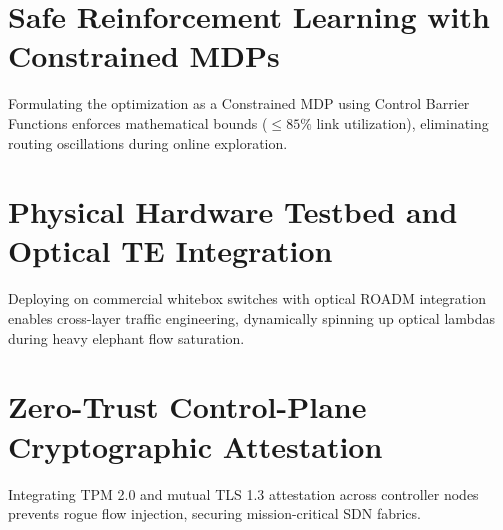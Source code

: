 \documentclass[12pt,a4paper,oneside]{report}
\begin{document}
\section{Safe Reinforcement Learning with Constrained MDPs}
Formulating the optimization as a Constrained MDP using Control Barrier Functions enforces mathematical bounds ($\le 85\%$ link utilization), eliminating routing oscillations during online exploration.

\section{Physical Hardware Testbed and Optical TE Integration}
Deploying on commercial whitebox switches with optical ROADM integration enables cross-layer traffic engineering, dynamically spinning up optical lambdas during heavy elephant flow saturation.

\section{Zero-Trust Control-Plane Cryptographic Attestation}
Integrating TPM 2.0 and mutual TLS 1.3 attestation across controller nodes prevents rogue flow injection, securing mission-critical SDN fabrics.

\clearpage
\end{document}

